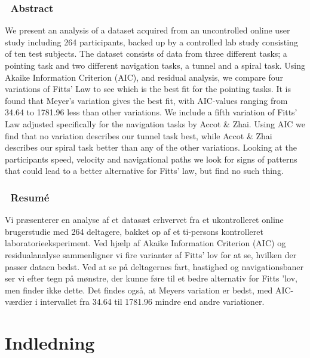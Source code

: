 

\subsection*{\centering~Abstract}
We present an analysis of a dataset acquired from an uncontrolled online user study including 264 participants, backed up by a controlled lab study consisting of ten test subjects. The dataset consists of data from three different tasks; a pointing task and two different navigation tasks, a tunnel and a spiral task. Using Akaike Information Criterion (AIC), and residual analysis, we compare four variations of Fitts' Law to see which is the best fit for the pointing tasks. It is found that Meyer's variation gives the best fit, with AIC-values ranging from 34.64 to 1781.96 less than other variations. We include a fifth variation of Fitts' Law adjusted specifically for the navigation tasks by Accot \& Zhai. Using AIC we find that no variation describes our tunnel task best, while Accot \& Zhai describes our spiral task better than any of the other variations. Looking at the participants speed, velocity and navigational paths we look for signs of patterns that could lead to a better alternative for Fitts' law, but find no such thing.

\subsection*{\centering~Resumé}

Vi præsenterer en analyse af et datasæt erhvervet fra et ukontrolleret online brugerstudie med 264 deltagere, bakket op af et ti-persons kontrolleret laboratorieeksperiment. Ved hjælp af Akaike Information Criterion (AIC) og residualanalyse sammenligner vi fire varianter af Fitts' lov for at se, hvilken der passer dataen bedst. Ved at se på deltagernes fart, hastighed og navigationsbaner ser vi efter tegn på mønstre, der kunne føre til et bedre alternativ for Fitts 'lov, men finder ikke dette. Det findes også, at Meyers variation er bedst, med AIC-værdier i intervallet fra 34.64 til 1781.96 mindre end andre variationer.

\chapter*{Indledning}

